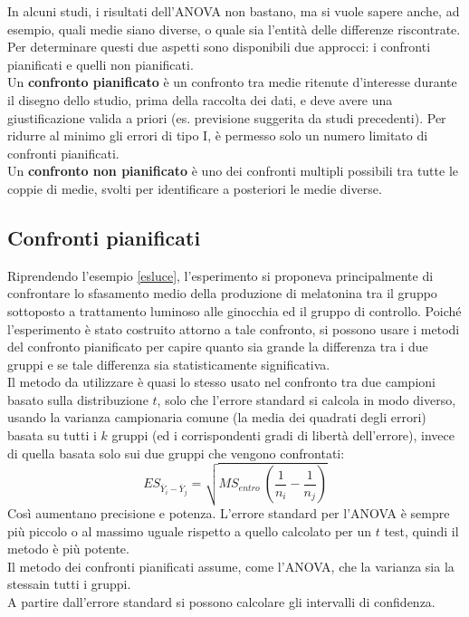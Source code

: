 \documentclass[10pt, draft]{book}
\begin{document}
In alcuni studi, i risultati dell'ANOVA non bastano, ma si vuole sapere anche, ad esempio, quali medie siano diverse, o quale sia l'entità delle differenze riscontrate. Per determinare questi due aspetti sono disponibili due approcci: i confronti pianificati e quelli non pianificati.\\
Un \textbf{confronto pianificato} è un confronto tra medie ritenute d'interesse durante il disegno dello studio, prima della raccolta dei dati, e deve avere una giustificazione valida a priori (es. previsione suggerita da studi precedenti). Per ridurre al minimo gli errori di tipo I, è permesso solo un numero limitato di confronti pianificati.\\
Un \textbf{confronto non pianificato} è uno dei confronti multipli possibili tra tutte le coppie di medie, svolti per identificare a posteriori le medie diverse.

\subsection{Confronti pianificati}

Riprendendo l'esempio \ref{esluce}, l'esperimento si proponeva principalmente di confrontare lo sfasamento medio della produzione di melatonina tra il gruppo sottoposto a trattamento luminoso alle ginocchia ed il gruppo di controllo. Poiché l'esperimento è stato costruito attorno a tale confronto, si possono usare i metodi del confronto pianificato per capire quanto sia grande la differenza tra i due gruppi e se tale differenza sia statisticamente significativa.\\
Il metodo da utilizzare è quasi lo stesso usato nel confronto tra due campioni basato sulla distribuzione $t$, solo che l'errore standard si calcola in modo diverso, usando la varianza campionaria comune (la media dei quadrati degli errori) basata su tutti i $k$ gruppi (ed i corrispondenti gradi di libertà dell'errore), invece di quella basata solo sui due gruppi che vengono confrontati:
\begin{equation}
    ES_{\overline{Y}_i-\overline{Y}_j} = \sqrt{MS_{entro}\ (\frac{1}{n_i}-\frac{1}{n_j})}
\end{equation}
Così aumentano precisione e potenza. L'errore standard per l'ANOVA è sempre più piccolo o al massimo uguale rispetto a quello calcolato per un $t$ test, quindi il metodo è più potente.\\
Il metodo dei confronti pianificati assume, come l'ANOVA, che la varianza sia la stessain tutti i gruppi.\\
A partire dall'errore standard si possono calcolare gli intervalli di confidenza.
\end{document}
